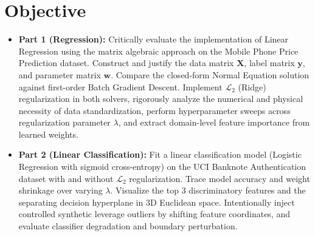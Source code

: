 \documentclass[12pt,a4paper]{article}
\begin{document}
\noindent
{}

\section{Objective}
\begin{itemize}
    \item \textbf{Part 1 (Regression):} Critically evaluate the implementation of Linear Regression using the matrix algebraic approach on the Mobile Phone Price Prediction dataset. Construct and justify the data matrix $\mathbf{X}$, label matrix $\mathbf{y}$, and parameter matrix $\mathbf{w}$. Compare the closed-form Normal Equation solution against first-order Batch Gradient Descent. Implement $\mathcal{L}_2$ (Ridge) regularization in both solvers, rigorously analyze the numerical and physical necessity of data standardization, perform hyperparameter sweeps across regularization parameter $\lambda$, and extract domain-level feature importance from learned weights.
    \item \textbf{Part 2 (Linear Classification):} Fit a linear classification model (Logistic Regression with sigmoid cross-entropy) on the UCI Banknote Authentication dataset with and without $\mathcal{L}_2$ regularization. Trace model accuracy and weight shrinkage over varying $\lambda$. Visualize the top 3 discriminatory features and the separating decision hyperplane in 3D Euclidean space. Intentionally inject controlled synthetic leverage outliers by shifting feature coordinates, and evaluate classifier degradation and boundary perturbation.
\end{itemize}
\end{document}
